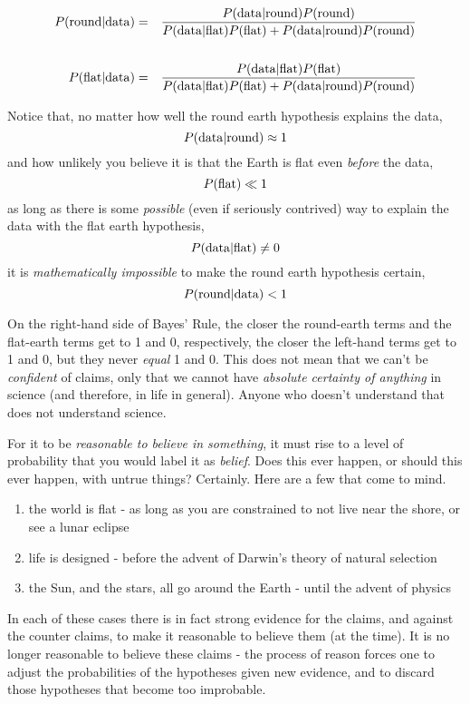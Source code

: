 \documentclass{tufte-book}
\begin{document}
\begin{eqnarray*}
P({\rm round}|{\rm data}) &=& \frac{P({\rm data}|{\rm round})P({\rm round})}{P({\rm data}|{\rm flat})P({\rm flat})+P({\rm data}|{\rm round})P({\rm round})}\\\\
P({\rm flat}|{\rm data}) &=& \frac{P({\rm data}|{\rm flat})P({\rm flat})}{P({\rm data}|{\rm flat})P({\rm flat})+P({\rm data}|{\rm round})P({\rm round})} 
\end{eqnarray*}

Notice that, no matter how well the round earth hypothesis explains the
data, \[P({\rm data}|{\rm round})\approx 1\] and how unlikely you
believe it is that the Earth is flat even \emph{before} the data,
\[P({\rm flat})\ll 1\] as long as there is some \emph{possible} (even if
seriously contrived) way to explain the data with the flat earth
hypothesis, \[P({\rm data}|{\rm flat}) \neq 0\] it is
\emph{mathematically impossible} to make the round earth hypothesis
certain, \[P({\rm round}|{\rm data})< 1\]

On the right-hand side of Bayes' Rule, the closer the round-earth terms
and the flat-earth terms get to 1 and 0, respectively, the closer the
left-hand terms get to 1 and 0, but they never \emph{equal} 1 and 0.
This does not mean that we can't be \emph{confident} of claims, only
that we cannot have \emph{absolute certainty of anything} in science
(and therefore, in life in general). Anyone who doesn't understand that
does not understand science.

For it to be \emph{reasonable to believe in something}, it must rise to
a level of probability that you would label it as \emph{belief}. Does
this ever happen, or should this ever happen, with untrue things?
Certainly. Here are a few that come to mind.

\begin{enumerate}
\def\labelenumi{\arabic{enumi}.}
\itemsep1pt\parskip0pt
\item
  the world is flat - as long as you are constrained to not live near
  the shore, or see a lunar eclipse
\item
  life is designed - before the advent of Darwin's theory of natural
  selection
\item
  the Sun, and the stars, all go around the Earth - until the advent of
  physics
\end{enumerate}

In each of these cases there is in fact strong evidence for the claims,
and against the counter claims, to make it reasonable to believe them
(at the time). It is no longer reasonable to believe these claims - the
process of reason forces one to adjust the probabilities of the
hypotheses given new evidence, and to discard those hypotheses that
become too improbable.
\end{document}
